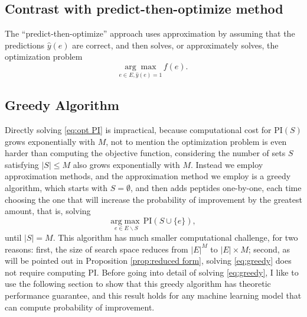 \documentclass[11pt]{article}
\newcommand{\PI}{\text{PI}}
\begin{document}
\subsection{Contrast with predict-then-optimize method} \label{sec:contrast with predict-then-optimize}
The \enquote{predict-then-optimize} approach uses approximation by assuming that the 
predictions $\hat{y}(e)$ are correct, and then solves, or approximately solves, the 
optimization problem 
\begin{equation*}
  \underset{e \in E, \hat{y}(e) = 1}{\arg\max} \, f(e).
  \label{}
\end{equation*}

\subsection{Greedy Algorithm} \label{sec:greedy algorithm}
Directly solving \eqref{eq:opt PI} is impractical, because computational cost for $\PI(S)$
grows exponentially with $M$, not to mention the optimization problem is even harder than
computing the objective function, considering the number of sets $S$ satisfying $|S| \leq M$
also grows exponentially with $M$. Instead we employ approximation methods, and the approximation
method we employ is a greedy algorithm, which starts with $S = \emptyset$, and then adds
peptides one-by-one, each time choosing the one that will increase the probability of 
improvement by the greatest amount, that is, solving 
\begin{equation}
  \underset{e \in E \backslash S}{\mathrm{arg}\max} \,\PI (S \cup \{e\}),
  \label{eq:greedy}
\end{equation}
until $|S| = M$. This algorithm has much smaller computational challenge, for two reasons:
first, the size of search space reduces from $|E|^M$ to $|E| \times M$; second, as will be pointed
out in Proposition \ref{prop:reduced form}, solving \eqref{eq:greedy} does not require computing $\PI$.
Before going into detail of solving \eqref{eq:greedy}, I like to use the following section
to show that this greedy algorithm has theoretic performance guarantee, and this result holds
for any machine learning model that can compute probability of improvement.
\end{document}
